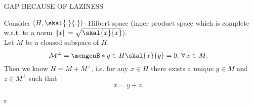\begin{theorem}
	GAP BECAUSE OF LAZINESS
\end{theorem}

Consider $(H, \skal{.}{.})$- Hilbert space (inner product space which is complete w.r.t. to a norm $\norm{x}= \sqrt{\skal{x}{x}}$). \\
Let $M$ be a cloased subspace of $H$. 
\[
	\mathcal{M}^{\perp} = \set[y \in H]{\skal{x}{y}= 0, \, \forall\,  x \in M}.
\]
Then we know $H = M + M^{\perp}$, i.e. for any $x \in H$ there exists a unique $y \in M$ and $z \in M^{\perp}$ such that
\[
	x = y + z.
\]
\begin{theorem}
	r
\end{theorem}




\cleardoubleoddemptypage
{}
\setcounter{page}{1}

